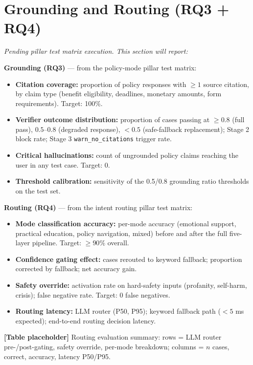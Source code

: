 \documentclass[10pt,a4paper]{report}
\begin{document}
\section{Grounding and Routing (RQ3 + RQ4)}

\begin{tcolorbox}[colback=yellow!8!white, colframe=orange!70!black, title=\textbf{Placeholder --- Grounding \& Routing Evaluation (RQ3 + RQ4)}, fonttitle=\bfseries, left=4pt, right=4pt, top=4pt, bottom=4pt]
\textit{Pending pillar test matrix execution. This section will report:}

\textbf{Grounding (RQ3)} --- from the policy-mode pillar test matrix:
\begin{itemize}[leftmargin=*, nosep]
  \item \textbf{Citation coverage:} proportion of policy responses with $\geq 1$ source citation, by claim type (benefit eligibility, deadlines, monetary amounts, form requirements). Target: 100\%.
  \item \textbf{Verifier outcome distribution:} proportion of cases passing at $\geq 0.8$ (full pass), $0.5$--$0.8$ (degraded response), $< 0.5$ (safe-fallback replacement); Stage 2 block rate; Stage 3 \texttt{warn\_no\_citations} trigger rate.
  \item \textbf{Critical hallucinations:} count of ungrounded policy claims reaching the user in any test case. Target: 0.
  \item \textbf{Threshold calibration:} sensitivity of the 0.5/0.8 grounding ratio thresholds on the test set.
\end{itemize}

\textbf{Routing (RQ4)} --- from the intent routing pillar test matrix:
\begin{itemize}[leftmargin=*, nosep]
  \item \textbf{Mode classification accuracy:} per-mode accuracy (emotional support, practical education, policy navigation, mixed) before and after the full five-layer pipeline. Target: $\geq 90\%$ overall.
  \item \textbf{Confidence gating effect:} cases rerouted to keyword fallback; proportion corrected by fallback; net accuracy gain.
  \item \textbf{Safety override:} activation rate on hard-safety inputs (profanity, self-harm, crisis); false negative rate. Target: 0 false negatives.
  \item \textbf{Routing latency:} LLM router (P50, P95); keyword fallback path ($< 5$ ms expected); end-to-end routing decision latency.
\end{itemize}

\medskip
\textbf{[Table placeholder]} Routing evaluation summary: rows = LLM router pre-/post-gating, safety override, per-mode breakdown; columns = $n$ cases, correct, accuracy, latency P50/P95.
\end{tcolorbox}
\end{document}
